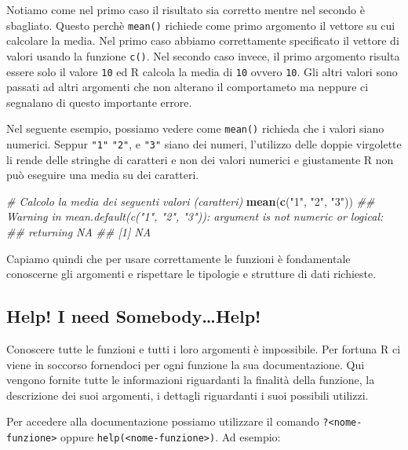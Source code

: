 \documentclass[
]{book}
\newenvironment{Shaded}{\begin{snugshade}}{\end{snugshade}}
\newcommand{\CommentTok}[1]{\textcolor[rgb]{0.56,0.35,0.01}{\textit{#1}}}
\newcommand{\KeywordTok}[1]{\textcolor[rgb]{0.13,0.29,0.53}{\textbf{#1}}}
\newcommand{\NormalTok}[1]{#1}
\newcommand{\StringTok}[1]{\textcolor[rgb]{0.31,0.60,0.02}{#1}}
\begin{document}
Notiamo come nel primo caso il risultato sia corretto mentre nel secondo è sbagliato. Questo perchè \texttt{mean()} richiede come primo argomento il vettore su cui calcolare la media. Nel primo caso abbiamo correttamente specificato il vettore di valori usando la funzione \texttt{c()}. Nel secondo caso invece, il primo argomento risulta essere solo il valore \texttt{10} ed R calcola la media di \texttt{10} ovvero \texttt{10}. Gli altri valori sono passati ad altri argomenti che non alterano il comportameto ma neppure ci segnalano di questo importante errore.

Nel seguente esempio, possiamo vedere come \texttt{mean()} richieda che i valori siano numerici. Seppur \texttt{"1"} \texttt{"2"}, e \texttt{"3"} siano dei numeri, l'utilizzo delle doppie virgolette li rende delle stringhe di caratteri e non dei valori numerici e giustamente R non può eseguire una media su dei caratteri.

\begin{Shaded}
\begin{Highlighting}[]
\CommentTok{# Calcolo la media dei seguenti valori (caratteri)}
\KeywordTok{mean}\NormalTok{(}\KeywordTok{c}\NormalTok{(}\StringTok{"1"}\NormalTok{, }\StringTok{"2"}\NormalTok{, }\StringTok{"3"}\NormalTok{))}
\CommentTok{## Warning in mean.default(c("1", "2", "3")): argument is not numeric or logical:}
\CommentTok{## returning NA}
\CommentTok{## [1] NA}
\end{Highlighting}
\end{Shaded}

Capiamo quindi che per usare correttamente le funzioni è fondamentale conoscerne gli argomenti e rispettare le tipologie e strutture di dati richieste.

\hypertarget{help-i-need-somebodyhelp}{%
\subsection{Help! I need Somebody\ldots Help!}\label{help-i-need-somebodyhelp}}

Conoscere tutte le funzioni e tutti i loro argomenti è impossibile. Per fortuna R ci viene in soccorso fornendoci per ogni funzione la sua documentazione. Qui vengono fornite tutte le informazioni riguardanti la finalità della funzione, la descrizione dei suoi argomenti, i dettagli riguardanti i suoi possibili utilizzi.

Per accedere alla documentazione possiamo utilizzare il comando \texttt{?\textless{}nome-funzione\textgreater{}} oppure \texttt{help(\textless{}nome-funzione\textgreater{})}. Ad esempio:
\end{document}
